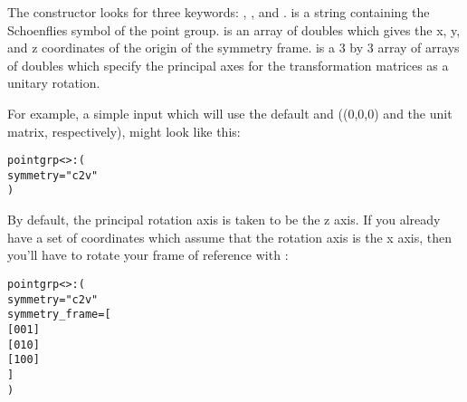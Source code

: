 

The   constructor looks
for three keywords: ,
, and
.  is a string containing the
Schoenflies symbol of the point group.   is an
array of doubles which gives the x, y, and z coordinates of
the origin of the symmetry frame.  
is a 3 by 3 array of arrays of doubles which specify the
principal axes for the transformation matrices as a unitary
rotation.

For example, a simple input which will use the default
 and  ((0,0,0) and the
unit matrix, respectively), might look like this:

\begin{alltt}
pointgrp<>: (
  symmetry = "c2v"
)
\end{alltt}

By default, the principal rotation axis is taken to be the z
axis.  If you already have a set of coordinates which assume
that the rotation axis is the x axis, then you'll have to
rotate your frame of reference with :

\begin{alltt}
pointgrp<>: (
  symmetry = "c2v"
  symmetry_frame = [
    [ 0 0 1 ]
    [ 0 1 0 ]
    [ 1 0 0 ]
  ]
)
\end{alltt}
